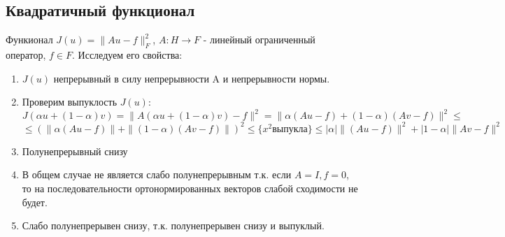\documentclass[9pt, a4paper]{extarticle}
\begin{document}
	\subsection*{Квадратичный функционал}
	Функионал $J(u) = \|Au - f\|_F^2$, $A: H \to F$ - линейный ограниченный оператор, $f \in F$. Исследуем его свойства:
	\begin{enumerate}
		\item $J(u)$ непрерывный в силу непрерывности A и непрерывности нормы.
		\item Проверим выпуклость $J(u)$: $J(\alpha u + (1-\alpha) v) = \|A\left(\alpha u + (1-\alpha) v\right) - f\|^2 = \|\alpha(Au - f) + (1 - \alpha) (Av - f) \|^2 \leq$ \newline
		$\leq \left(\|\alpha(Au - f)\| + \|(1 - \alpha) (Av - f) \| \right)^2 \leq \{x^2 \text{выпукла}\} \leq |\alpha| \|(Au - f)\|^2 + |1 - \alpha| \| Av - f\|^2$
		\item Полунепрерывный снизу
		\item В общем случае не является слабо полунепрерывным т.к. если $A = I, f = 0$, то на последовательности ортонормированных векторов слабой сходимости не будет.
		\item Слабо полунепрерывен снизу, т.к. полунепрерывен снизу и выпуклый.
	\end{enumerate}
\end{document}
